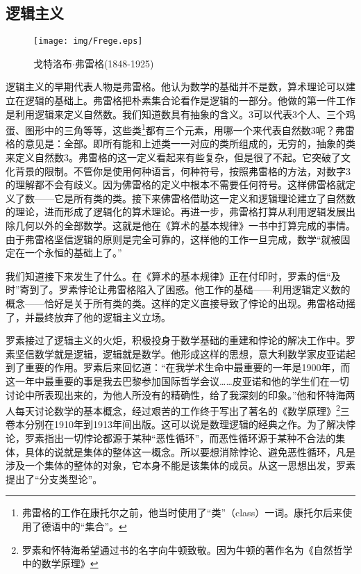 \documentclass{article}
\begin{document}
\subsection{逻辑主义}

\begin{wrapfigure}{L}{0.3\textwidth}
 \centering
 \texttt{[image: img/Frege.eps]}
 \captionsetup{labelformat=empty}
 \caption{戈特洛布$\cdot$弗雷格(1848-1925)}
 \label{fig:Frege}
\end{wrapfigure}

逻辑主义的早期代表人物是弗雷格。他认为数学的基础并不是数，算术理论可以建立在逻辑的基础上。弗雷格把朴素集合论看作是逻辑的一部分。他做的第一件工作是利用逻辑来定义自然数。我们知道数具有抽象的含义。3可以代表3个人、三个鸡蛋、图形中的三角等等，这些类\footnote{弗雷格的工作在康托尔之前，他当时使用了“类”（class）一词。康托尔后来使用了德语中的“集合”。}都有三个元素，用哪一个来代表自然数3呢？弗雷格的意见是：全部。即所有能和上述类一一对应的类所组成的，无穷的，抽象的类来定义自然数3。弗雷格的这一定义看起来有些复杂，但是很了不起。它突破了文化背景的限制。不管你是使用何种语言，何种符号，按照弗雷格的方法，对数字3的理解都不会有歧义。因为佛雷格的定义中根本不需要任何符号。这样佛雷格就定义了数——它是所有类的类。接下来佛雷格借助这一定义和逻辑理论建立了自然数的理论，进而形成了逻辑化的算术理论。再进一步，弗雷格打算从利用逻辑发展出除几何以外的全部数学。这就是他在《算术的基本规律》一书中打算完成的事情。由于弗雷格坚信逻辑的原则是完全可靠的，这样他的工作一旦完成，数学“就被固定在一个永恒的基础上了。”

我们知道接下来发生了什么。在《算术的基本规律》正在付印时，罗素的信“及时”寄到了。罗素悖论让弗雷格陷入了困惑。他工作的基础——利用逻辑定义数的概念——恰好是关于所有类的类。这样的定义直接导致了悖论的出现。弗雷格动摇了，并最终放弃了他的逻辑主义立场。

罗素接过了逻辑主义的火炬，积极投身于数学基础的重建和悖论的解决工作中。罗素坚信数学就是逻辑，逻辑就是数学。他形成这样的思想，意大利数学家皮亚诺起到了重要的作用。罗素后来回忆道：“在我学术生命中最重要的一年是1900年，而这一年中最重要的事是我去巴黎参加国际哲学会议……皮亚诺和他的学生们在一切讨论中所表现出来的，为他人所没有的精确性，给了我深刻的印象。”他和怀特海两人每天讨论数学的基本概念，经过艰苦的工作终于写出了著名的《数学原理》\footnote{罗素和怀特海希望通过书的名字向牛顿致敬。因为牛顿的著作名为《自然哲学中的数学原理》}三卷本分别在1910年到1913年间出版。这可以说是数理逻辑的经典之作。为了解决悖论，罗素指出一切悖论都源于某种“恶性循环”，而恶性循环源于某种不合法的集体，具体的说就是集体的整体这一概念。所以要想消除悖论、避免恶性循环，凡是涉及一个集体的整体的对象，它本身不能是该集体的成员。从这一思想出发，罗素提出了“分支类型论”。
\end{document}
